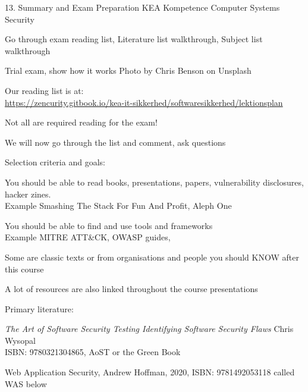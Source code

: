 \documentclass[Screen16to9,17pt]{foils}
\begin{document}
\mytitlepage
{13. Summary and Exam Preparation}
{KEA Kompetence Computer Systems Security}





\begin{list1}
\item Go through exam reading list, Literature list walkthrough, Subject list walkthrough
\item Trial exam, show how it works \hfill {\small Photo by Chris Benson on Unsplash}

\end{list1}




\begin{list1}
\item Our reading list is at:\\
{\small\url{https://zencurity.gitbook.io/kea-it-sikkerhed/softwaresikkerhed/lektionsplan}}
\item Not all are required reading for the exam!
\item We will now go through the list and comment, ask questions
\item Selection criteria and goals:
\begin{list2}
\item You should be able to read books, presentations, papers, vulnerability disclosures, hacker zines. \\
Example Smashing The Stack For Fun And Profit, Aleph One
\item You should be able to find and use tools and frameworks\\
Example MITRE ATT\&CK, OWASP guides,
\end{list2}
\item Some are classic texts or from organisations and people you should KNOW after this course
\item A lot of resources are also linked throughout the course presentations
\end{list1}





Primary literature:
\begin{list2}
\item \emph{The Art of Software Security Testing Identifying Software Security Flaws}
Chris Wysopal\\
ISBN: 9780321304865, AoST or the Green Book
\item Web Application Security, Andrew Hoffman, 2020, ISBN: 9781492053118 called WAS below
\end{list2}
\end{document}
